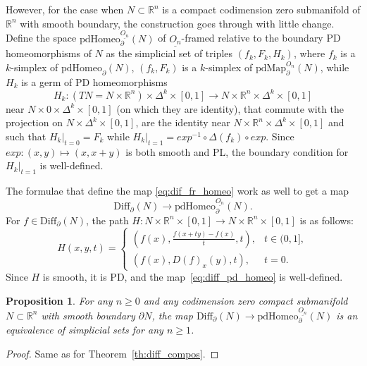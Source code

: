 \documentclass[11pt]{amsart}
\newtheorem{proposition}[theorem]{Proposition}
\theoremstyle{definition}
\newcommand{\R}{{\mathbb R}}
\newcommand{\pdMap}{\mathrm{pdMap}}
\newcommand{\Diff}{\mathrm{Diff}}
\newcommand{\pdHomeo}{\mathrm{pdHomeo}}
\numberwithin{equation}{section}
\begin{document}
However, for the case when $N\subset\R^n$ is a compact codimension zero submanifold of $\R^n$ with smooth boundary, the construction goes through with little change.  Define the space  $\pdHomeo_\partial^{\underline{O_n}}(N)$ of ${\underline{O_n}}$-framed relative
to the boundary
PD homeomorphisms of $N$ as the simplicial set of triples $(f_k,F_k,H_k)$, where $f_k$ is a $k$-simplex of $\pdHomeo_\partial(N)$,
$(f_k,F_k)$ is a $k$-simplex of $\pdMap_\partial^{O_n}(N)$, while $H_k$ is a germ of PD homeomorphisms 
$$
H_k\colon \left(TN=N\times\R^n\right)\times\Delta^k\times[0,1]
\to N\times \R^n\times\Delta^k\times[0,1]
$$
 near $N\times 0\times\Delta^k\times[0,1]$
 (on which they are identity), that commute with the projection on $N\times\Delta^k\times[0,1]$, are the identity near $N\times\R^n\times \Delta^k\times [0,1]$ and such that $H_k|_{t=0}=F_k$ while $H_k|_{t=1}=exp^{-1}\circ \Delta(f_k)\circ exp$. Since $exp\colon (x,y)\mapsto (x,x+y)$ is both smooth and PL,
 the boundary condition for $H_k|_{t=1}$ is well-defined.

The formulae that define the map \eqref{eq:dif_fr_homeo} work as well to get a map 
\begin{equation}\label{eq:diff_pd_homeo}
\Diff_\partial(N)\to\pdHomeo_{\partial}^{\underline{O_n}}(N).
\end{equation}
For  $f\in\Diff_\partial(N)$,  the path $H\colon N\times\R^n\times[0,1]\to N\times\R^n\times[0,1]$ is as follows:
\[
H(x,y,t)=
\begin{cases}
(f(x),\frac{f(x+ty)-f(x)}{t},t),&t\in(0,1],\\
(f(x),D(f)_x(y),t),&t=0.
\end{cases}
\]
Since $H$ is smooth, it is PD, and the map~\eqref{eq:diff_pd_homeo}  is well-defined.

\begin{proposition}\label{p:dif_homeo_pd}
For any $n\geq 0$ and any codimension zero compact submanifold $N\subset\R^n$ with smooth boundary $\partial N$, the map $\Diff_\partial(N)\to\pdHomeo_{\partial}^{\underline{O_n}}(N)$ is an equivalence of simplicial sets for any $n\geq 1$.
\end{proposition}

\begin{proof}
Same as for Theorem~\ref{th:diff_compos}.
\end{proof}
\end{document}
